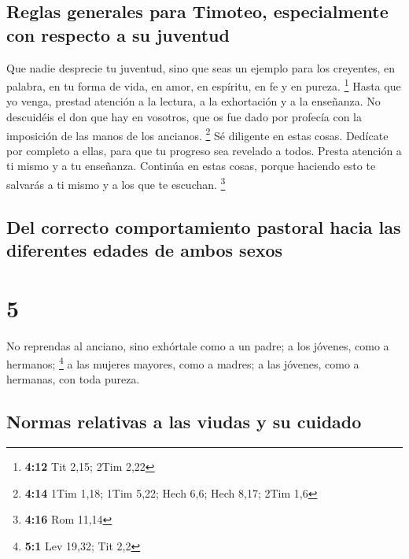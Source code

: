\hypertarget{reglas-generales-para-timoteo-especialmente-con-respecto-a-su-juventud}{%
\subsection{Reglas generales para Timoteo, especialmente con respecto a
su
juventud}\label{reglas-generales-para-timoteo-especialmente-con-respecto-a-su-juventud}}

 Que nadie desprecie tu juventud, sino que seas un
ejemplo para los creyentes, en palabra, en tu forma de vida, en amor, en
espíritu, en fe y en pureza. \footnote{\textbf{4:12} Tit 2,15; 2Tim 2,22}
 Hasta que yo venga, prestad atención a la lectura, a la
exhortación y a la enseñanza.  No descuidéis el don que
hay en vosotros, que os fue dado por profecía con la imposición de las
manos de los ancianos. \footnote{\textbf{4:14} 1Tim 1,18; 1Tim 5,22;
  Hech 6,6; Hech 8,17; 2Tim 1,6}  Sé diligente en estas
cosas. Dedícate por completo a ellas, para que tu progreso sea revelado
a todos.  Presta atención a ti mismo y a tu enseñanza.
Continúa en estas cosas, porque haciendo esto te salvarás a ti mismo y a
los que te escuchan. \footnote{\textbf{4:16} Rom 11,14}

\hypertarget{del-correcto-comportamiento-pastoral-hacia-las-diferentes-edades-de-ambos-sexos}{%
\subsection{Del correcto comportamiento pastoral hacia las diferentes
edades de ambos
sexos}\label{del-correcto-comportamiento-pastoral-hacia-las-diferentes-edades-de-ambos-sexos}}

\hypertarget{section-4}{%
\section{5}\label{section-4}}

 No reprendas al anciano, sino exhórtale como a un padre;
a los jóvenes, como a hermanos; \footnote{\textbf{5:1} Lev 19,32; Tit
  2,2}  a las mujeres mayores, como a madres; a las
jóvenes, como a hermanas, con toda pureza.

\hypertarget{normas-relativas-a-las-viudas-y-su-cuidado}{%
\subsection{Normas relativas a las viudas y su
cuidado}\label{normas-relativas-a-las-viudas-y-su-cuidado}}

